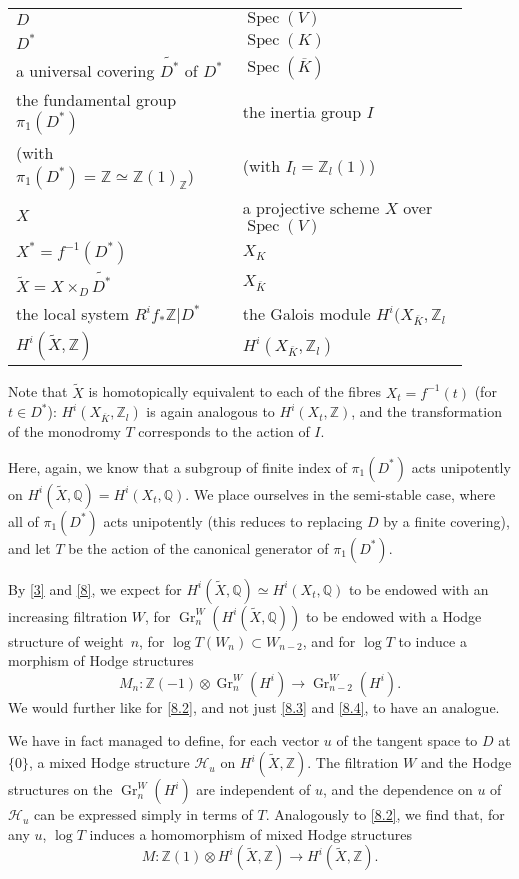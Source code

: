 \documentclass{article}
\theoremstyle{plain}
\theoremstyle{definition}
\newenvironment{env}[1]
    {\renewcommand\theinnercustomenv{#1}\innercustomenv}
    {\endinnercustomenv}
\newcommand{\ZZ}{\mathbb{Z}}
\newcommand{\QQ}{\mathbb{Q}}
\DeclareMathOperator{\Gr}{Gr}
\DeclareMathOperator{\Spec}{Spec}
\newcommand{\oldpage}[1]{\marginpar{\footnotesize$\Big\vert$ \textit{p.~#1}}}
\begin{document}
\begin{env}{9.1}
  \phantom{}
  \begin{tabular}{p{0.45\linewidth}|p{0.45\linewidth}}
    \toprule
    $D$
    & $\Spec(V)$
  \\$D^*$
    & $\Spec(K)$
  \\a universal covering $\widetilde{D^*}$ of $D^*$
    & $\Spec(\overline{K})$
  \\the fundamental group $\pi_1(D^*)$
    & the inertia group $I$
  \\(with $\pi_1(D^*)=\ZZ\simeq\ZZ(1)_\ZZ$)
    & (with $I_l=\ZZ_l(1)$)
  \\$X$
    & a projective scheme $X$ over $\Spec(V)$
  \\$X^*=f^{-1}(D^*)$
    & $X_K$
  \\$\widetilde{X}=X\times_D\widetilde{D^*}$
    & $X_{\overline{K}}$
  \\the local system $R^if_*\ZZ|D^*$
    & the Galois module $H^i(X_{\overline{K}},\ZZ_l$
  \\$H^i(\widetilde{X},\ZZ)$
    & $H^i(X_{\overline{K}},\ZZ_l)$
  \end{tabular}
\end{env}

Note that $\widetilde{X}$ is homotopically equivalent to each of the fibres $X_t=f^{-1}(t)$ (for $t\in D^*$): $H^i(X_{\overline{K}},\ZZ_l)$ is again analogous to $H^i(X_t,\ZZ)$, and the transformation of the monodromy $T$ corresponds to the action of $I$.

Here, again, we know that a subgroup of finite index of $\pi_1(D^*)$ acts unipotently on $H^i(\widetilde{X},\QQ)=H^i(X_t,\QQ)$.
We place ourselves in the semi-stable case, where all of $\pi_1(D^*)$ acts unipotently (this reduces to replacing $D$ by a finite covering), and let $T$ be the action of the canonical generator of $\pi_1(D^*)$.

By \cref{3} and \cref{8}, we expect for $H^i(\widetilde{X},\QQ)\simeq H^i(X_t,\QQ)$ to be endowed with an increasing filtration $W$, for $\Gr_n^W(H^i(\widetilde{X},\QQ))$ to be endowed with a Hodge structure of weight~$n$, for $\log T(W_n)\subset W_{n-2}$, and for $\log T$ to induce a morphism of Hodge structures
\[
  M_n\colon \ZZ(-1)\otimes\Gr_n^W(H^i) \to \Gr_{n-2}^W(H^i).
\]
We would further like for \cref{8.2}, and not just \cref{8.3} and \cref{8.4}, to have an analogue.

We have in fact managed to define, for each vector $u$ of the tangent space to $D$ at $\{0\}$, a mixed Hodge structure $\mathscr{H}_u$ on $H^i(\widetilde{X},\ZZ)$.
The filtration $W$ and the Hodge structures on the $\Gr_n^W(H^i)$ are independent of $u$, and the dependence on $u$ of $\mathscr{H}_u$ can be expressed
\oldpage{430}
simply in terms of $T$.
Analogously to \cref{8.2}, we find that, for any $u$, $\log T$ induces a homomorphism of mixed Hodge structures
\[
  M\colon \ZZ(1)\otimes H^i(\widetilde{X},\ZZ) \to H^i(\widetilde{X},\ZZ).
\]
\end{document}
